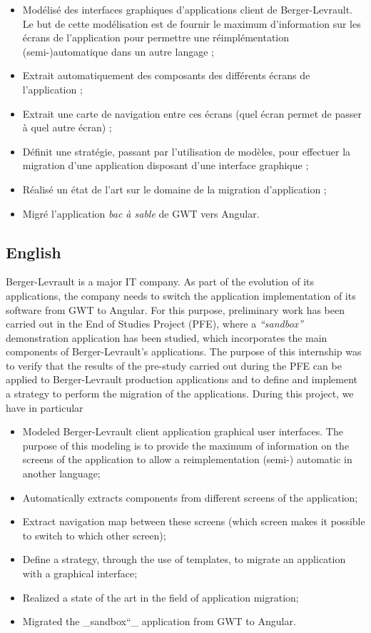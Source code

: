 \begin{itemize}
\tightlist
\item
  Modélisé des interfaces graphiques d'applications client de
  Berger-Levrault. Le but de cette modélisation est de fournir le
  maximum d'information sur les écrans de l'application pour permettre
  une réimplémentation (semi-)automatique dans un autre langage ;
\item
  Extrait automatiquement des composants des différents écrans de
  l'application ;
\item
  Extrait une carte de navigation entre ces écrans (quel écran permet de
  passer à quel autre écran) ;
\item
  Définit une stratégie, passant par l'utilisation de modèles, pour
  effectuer la migration d'une application disposant d'une interface
  graphique ;
\item
  Réalisé un état de l'art sur le domaine de la migration d'application
  ;
\item
  Migré l'application \emph{bac à sable} de GWT vers Angular.
\end{itemize}

\hypertarget{english}{%
\subsection{English}\label{english}}

Berger-Levrault is a major IT company. As part of the evolution of its
applications, the company needs to switch the application implementation
of its software from GWT to Angular. For this purpose, preliminary work
has been carried out in the End of Studies Project (PFE), where a
\emph{``sandbox''} demonstration application has been studied, which
incorporates the main components of Berger-Levrault's applications. The
purpose of this internship was to verify that the results of the
pre-study carried out during the PFE can be applied to Berger-Levrault
production applications and to define and implement a strategy to
perform the migration of the applications. During this project, we have
in particular

\begin{itemize}
\tightlist
\item
  Modeled Berger-Levrault client application graphical user interfaces.
  The purpose of this modeling is to provide the maximum of information
  on the screens of the application to allow a reimplementation (semi-)
  automatic in another language;
\item
  Automatically extracts components from different screens of the
  application;
\item
  Extract navigation map between these screens (which screen makes it
  possible to switch to which other screen);
\item
  Define a strategy, through the use of templates, to migrate an
  application with a graphical interface;
\item
  Realized a state of the art in the field of application migration;
\item
  Migrated the \_sandbox``\_ application from GWT to Angular.
\end{itemize}
